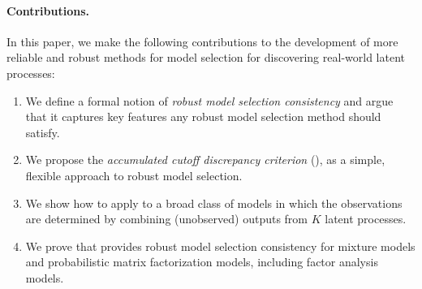 \paragraph{Contributions.}
In this paper, we make the following contributions to the development of more reliable
and robust methods for model selection for discovering real-world latent processes:
\begin{enumerate}
    \item We define a formal notion of \textit{robust model selection consistency}
    and argue that it captures key features any robust model selection method 
    should satisfy. 
	\item We propose the \emph{accumulated cutoff discrepancy criterion} (\methodname), as a simple, flexible approach to robust model selection. 
	\item We show how to apply \methodname to a broad class of models
	in which the observations are determined by combining (unobserved) outputs from $K$ latent processes.
	\item We prove that \methodname provides robust model selection 
    consistency for mixture models and probabilistic matrix factorization models, including factor analysis models. 

\end{enumerate}
